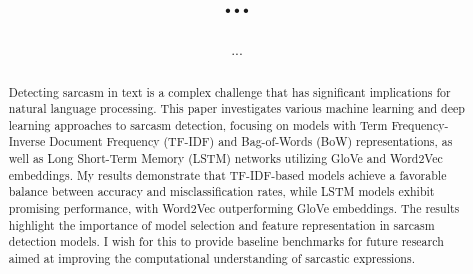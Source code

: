 \documentclass[runningheads]{llncs}
\begin{document}
    \title{...}

    \author{...}

    
    \maketitle 
    
    \begin{abstract}
        Detecting sarcasm in text is a complex challenge that has significant implications for natural language processing. This paper investigates various machine learning and deep 
        learning approaches to sarcasm detection, focusing on models with Term Frequency-Inverse Document Frequency (TF-IDF) and Bag-of-Words (BoW) representations, as well as 
        Long Short-Term Memory (LSTM) networks utilizing GloVe and Word2Vec embeddings. My results demonstrate that TF-IDF-based models achieve a favorable balance between accuracy and 
        misclassification rates, while LSTM models exhibit promising performance, with Word2Vec outperforming GloVe embeddings. The results highlight the importance of model selection and 
        feature representation in sarcasm detection models. I wish for this to provide baseline benchmarks for future research aimed at improving the computational understanding of sarcastic expressions.
    \end{abstract}
    

    
    
    
    
    
    
    
    
    
\end{document}
